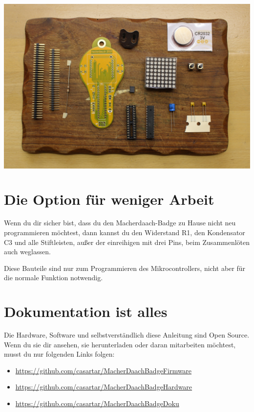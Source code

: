 \documentclass{article}
\begin{document}
\begin{center}
\includegraphics[width=\textwidth]{Bilder/IMG_5537.JPG}
\label{fig:all_components}
\end{center}

\section{Die Option für weniger Arbeit}

Wenn du dir sicher bist, dass du den Macherdaach-Badge zu Hause nicht neu programmieren möchtest, dann kannst du den Widerstand R1, den Kondensator C3 und alle Stiftleisten, außer der einreihigen mit drei Pins, beim Zusammenlöten auch weglassen.

Diese Bauteile sind nur zum Programmieren des Mikrocontrollers, nicht aber für die normale Funktion notwendig.

\section{Dokumentation ist alles}

Die Hardware, Software und selbstverständlich diese Anleitung sind Open Source. Wenn du sie dir ansehen, sie herunterladen oder daran mitarbeiten möchtest, musst du nur folgenden Links folgen:

\begin{itemize}
	\item \url{https://github.com/casartar/MacherDaachBadgeFirmware}
	\item \url{https://github.com/casartar/MacherDaachBadgeHardware}
	\item \url{https://github.com/casartar/MacherDaachBadgeDoku}
\end{itemize}
\end{document}
